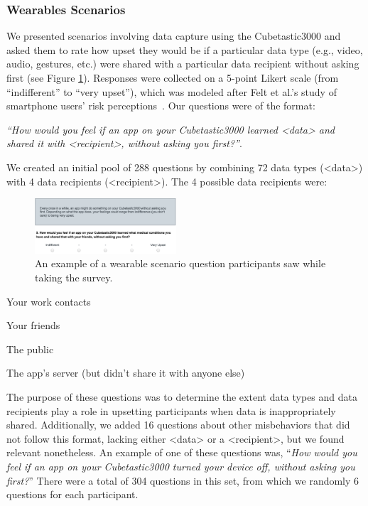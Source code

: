 \subsubsection{Wearables Scenarios}
We presented scenarios involving data capture using the Cubetastic3000 and asked them to rate how upset they would be if a particular data type (e.g., video, audio, gestures, etc.) were shared with a particular data recipient without asking first (see Figure \ref{fig:prompt}). Responses were collected on a 5-point Likert scale (from ``indifferent'' to ``very upset''), which was modeled after Felt et al.'s study of smartphone users' risk perceptions~\cite{Felt}. Our questions were of the format: 

\textit{``How would you feel if an app on your Cubetastic3000 learned <data> and shared it with <recipient>, without asking you first?''}. 

We created an initial pool of 288 questions by combining 72 data types (<data>) with 4 data recipients (<recipient>). The 4 possible data recipients were: \\[-.8cm]

\begin{figure}[t]
	\centering
	\includegraphics[width=0.47\textwidth]{images/prompt.pdf}
	\caption{An example of a wearable scenario question participants saw while taking the survey.}
	\label{fig:prompt}
\end{figure}

\begin{packed_item}
\item Your work contacts
\item Your friends
\item The public
\item The app's server (but didn't share it with anyone else)\\[-.8cm]
\end{packed_item}

The purpose of these questions was to determine the extent data types and data recipients play a role in upsetting participants when data is inappropriately shared. Additionally, we added 16 questions about other misbehaviors that did not follow this format, lacking either <data> or a <recipient>, but we found relevant nonetheless. An example of one of these questions was, ``\textit{How would you feel if an app on your Cubetastic3000 turned your device off, without asking you first?}'' There were a total of 304 questions in this set, from which we randomly 6 questions for each participant.

